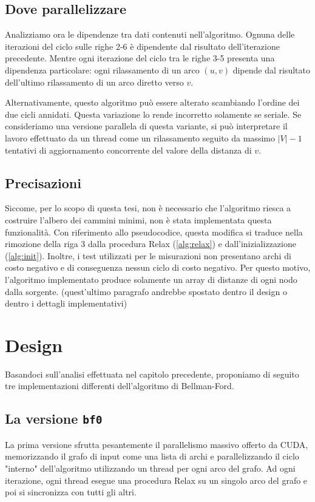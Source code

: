 \documentclass[a4paper]{article}
\begin{document}
	\subsection{Dove parallelizzare}
	Analizziamo ora le dipendenze tra dati contenuti nell'algoritmo. Ognuna delle iterazioni del ciclo sulle righe 2-6 è dipendente dal risultato dell'iterazione precedente. Mentre ogni iterazione del ciclo tra le righe 3-5 presenta una dipendenza particolare: ogni rilassamento di un arco $(u,v)$ dipende dal risultato dell'ultimo rilassamento di un arco diretto verso $v$.
	
	Alternativamente, questo algoritmo può essere alterato scambiando l'ordine dei due cicli annidati. Questa variazione lo rende incorretto solamente se seriale. Se consideriamo una versione parallela di questa variante, si può interpretare il lavoro effettuato da un thread come un rilassamento seguito da massimo $|V|-1$ tentativi di aggiornamento concorrente del valore della distanza di $v$.
	
	\subsection{Precisazioni}
	Siccome, per lo scopo di questa tesi, non è necessario che l'algoritmo riesca a costruire l'albero dei cammini minimi, non è stata implementata questa funzionalità. Con riferimento allo pseudocodice, questa modifica si traduce nella rimozione della riga 3 dalla procedura Relax (\ref{alg:relax}) e dall'inizializzazione (\ref{alg:init}). Inoltre, i test utilizzati per le misurazioni non presentano archi di costo negativo e di conseguenza nessun ciclo di costo negativo. Per questo motivo, l'algoritmo implementato produce solamente un array di distanze di ogni nodo dalla sorgente.
	(quest'ultimo paragrafo andrebbe spostato dentro il design o dentro i dettagli implementativi)
	
	\section{Design}
	\label{section:design}
	Basandoci sull'analisi effettuata nel capitolo precedente, proponiamo di seguito tre implementazioni differenti dell'algoritmo di Bellman-Ford.
	
	\subsection{La versione \texttt{bf0}}
	La prima versione sfrutta pesantemente il parallelismo massivo offerto da CUDA, memorizzando il grafo di input come una lista di archi e parallelizzando il ciclo "interno" dell'algoritmo utilizzando un thread per ogni arco del grafo. Ad ogni iterazione, ogni thread esegue una procedura Relax su un singolo arco del grafo e poi si sincronizza con tutti gli altri.
	
\end{document}
